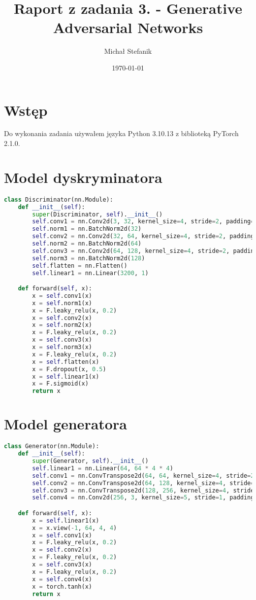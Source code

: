 \documentclass[a4paper]{article}
\author{Michał Stefanik}
\date{\today}
\title{Raport z zadania 3. - Generative Adversarial Networks}
\begin{document}
\maketitle
\section{Wstęp}
Do wykonania zadania używałem języka Python 3.10.13
z biblioteką PyTorch 2.1.0.
\section{Model dyskryminatora}

\begin{lstlisting}[language=python]
class Discriminator(nn.Module):
    def __init__(self):
        super(Discriminator, self).__init__()
        self.conv1 = nn.Conv2d(3, 32, kernel_size=4, stride=2, padding=2)
        self.norm1 = nn.BatchNorm2d(32)
        self.conv2 = nn.Conv2d(32, 64, kernel_size=4, stride=2, padding=2)
        self.norm2 = nn.BatchNorm2d(64)
        self.conv3 = nn.Conv2d(64, 128, kernel_size=4, stride=2, padding=2)
        self.norm3 = nn.BatchNorm2d(128)
        self.flatten = nn.Flatten()
        self.linear1 = nn.Linear(3200, 1)

    def forward(self, x):
        x = self.conv1(x)
        x = self.norm1(x)
        x = F.leaky_relu(x, 0.2)
        x = self.conv2(x)
        x = self.norm2(x)
        x = F.leaky_relu(x, 0.2)
        x = self.conv3(x)
        x = self.norm3(x)
        x = F.leaky_relu(x, 0.2)
        x = self.flatten(x)
        x = F.dropout(x, 0.5)
        x = self.linear1(x)
        x = F.sigmoid(x)
        return x
\end{lstlisting}

\section{Model generatora}

\begin{lstlisting}[language=python]
class Generator(nn.Module):
    def __init__(self):
        super(Generator, self).__init__()
        self.linear1 = nn.Linear(64, 64 * 4 * 4)
        self.conv1 = nn.ConvTranspose2d(64, 64, kernel_size=4, stride=2, padding=1)
        self.conv2 = nn.ConvTranspose2d(64, 128, kernel_size=4, stride=2, padding=1)
        self.conv3 = nn.ConvTranspose2d(128, 256, kernel_size=4, stride=2, padding=1)
        self.conv4 = nn.Conv2d(256, 3, kernel_size=5, stride=1, padding=2)

    def forward(self, x):
        x = self.linear1(x)
        x = x.view(-1, 64, 4, 4)
        x = self.conv1(x)
        x = F.leaky_relu(x, 0.2)
        x = self.conv2(x)
        x = F.leaky_relu(x, 0.2)
        x = self.conv3(x)
        x = F.leaky_relu(x, 0.2)
        x = self.conv4(x)
        x = torch.tanh(x)
        return x
\end{lstlisting}
\end{document}
